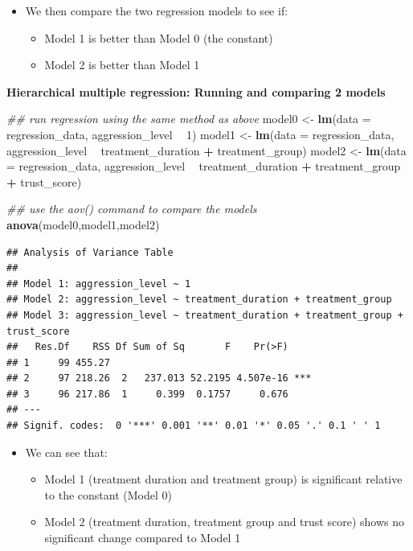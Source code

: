 \documentclass[
]{book}
\newenvironment{Shaded}{\begin{snugshade}}{\end{snugshade}}
\newcommand{\CommentTok}[1]{\textcolor[rgb]{0.56,0.35,0.01}{\textit{#1}}}
\newcommand{\DataTypeTok}[1]{\textcolor[rgb]{0.13,0.29,0.53}{#1}}
\newcommand{\DecValTok}[1]{\textcolor[rgb]{0.00,0.00,0.81}{#1}}
\newcommand{\KeywordTok}[1]{\textcolor[rgb]{0.13,0.29,0.53}{\textbf{#1}}}
\newcommand{\NormalTok}[1]{#1}
\newcommand{\OperatorTok}[1]{\textcolor[rgb]{0.81,0.36,0.00}{\textbf{#1}}}
\newcommand{\StringTok}[1]{\textcolor[rgb]{0.31,0.60,0.02}{#1}}
\providecommand{\tightlist}{%
  \setlength{\itemsep}{0pt}\setlength{\parskip}{0pt}}
\begin{document}
\begin{itemize}
\tightlist
\item
  We then compare the two regression models to see if:

  \begin{itemize}
  \tightlist
  \item
    Model 1 is better than Model 0 (the constant)
  \item
    Model 2 is better than Model 1
  \end{itemize}
\end{itemize}

\textbf{Hierarchical multiple regression: Running and comparing 2 models}

\begin{Shaded}
\begin{Highlighting}[]
\CommentTok{## run regression using the same method as above}
\NormalTok{model0 <-}\StringTok{ }\KeywordTok{lm}\NormalTok{(}\DataTypeTok{data =}\NormalTok{ regression_data, aggression_level }\OperatorTok{~}\StringTok{ }\DecValTok{1}\NormalTok{)}
\NormalTok{model1 <-}\StringTok{ }\KeywordTok{lm}\NormalTok{(}\DataTypeTok{data =}\NormalTok{ regression_data, aggression_level }\OperatorTok{~}\StringTok{ }\NormalTok{treatment_duration }\OperatorTok{+}\StringTok{ }\NormalTok{treatment_group)}
\NormalTok{model2 <-}\StringTok{ }\KeywordTok{lm}\NormalTok{(}\DataTypeTok{data =}\NormalTok{ regression_data, aggression_level }\OperatorTok{~}\StringTok{ }\NormalTok{treatment_duration }\OperatorTok{+}\StringTok{ }\NormalTok{treatment_group }\OperatorTok{+}\StringTok{ }\NormalTok{trust_score)}

\CommentTok{## use the aov() command to compare the models}
\KeywordTok{anova}\NormalTok{(model0,model1,model2)}
\end{Highlighting}
\end{Shaded}

\begin{verbatim}
## Analysis of Variance Table
## 
## Model 1: aggression_level ~ 1
## Model 2: aggression_level ~ treatment_duration + treatment_group
## Model 3: aggression_level ~ treatment_duration + treatment_group + trust_score
##   Res.Df    RSS Df Sum of Sq       F    Pr(>F)    
## 1     99 455.27                                   
## 2     97 218.26  2   237.013 52.2195 4.507e-16 ***
## 3     96 217.86  1     0.399  0.1757     0.676    
## ---
## Signif. codes:  0 '***' 0.001 '**' 0.01 '*' 0.05 '.' 0.1 ' ' 1
\end{verbatim}

\begin{itemize}
\tightlist
\item
  We can see that:

  \begin{itemize}
  \tightlist
  \item
    Model 1 (treatment duration and treatment group) is significant relative to the constant (Model 0)
  \item
    Model 2 (treatment duration, treatment group and trust score) shows no significant change compared to Model 1
  \end{itemize}
\end{itemize}
\end{document}
